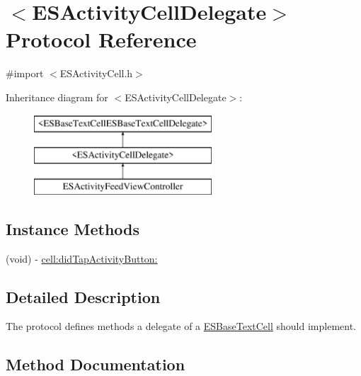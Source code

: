 \hypertarget{protocol_e_s_activity_cell_delegate-p}{}\section{$<$E\+S\+Activity\+Cell\+Delegate$>$ Protocol Reference}
\label{protocol_e_s_activity_cell_delegate-p}


{\ttfamily \#import $<$E\+S\+Activity\+Cell.\+h$>$}

Inheritance diagram for $<$E\+S\+Activity\+Cell\+Delegate$>$\+:\begin{figure}[H]
\begin{center}
\leavevmode
\includegraphics[height=3.000000cm]{protocol_e_s_activity_cell_delegate-p}
\end{center}
\end{figure}
\subsection*{Instance Methods}
\begin{DoxyCompactItemize}
\item 
(void) -\/ \hyperlink{protocol_e_s_activity_cell_delegate-p_a463f7734449d587762c93ec50f901676}{cell\+:did\+Tap\+Activity\+Button\+:}
\end{DoxyCompactItemize}


\subsection{Detailed Description}
The protocol defines methods a delegate of a \hyperlink{interface_e_s_base_text_cell}{E\+S\+Base\+Text\+Cell} should implement. 

\subsection{Method Documentation}
\hypertarget{protocol_e_s_activity_cell_delegate-p_a463f7734449d587762c93ec50f901676}{}

